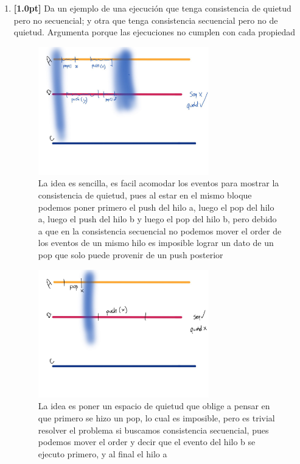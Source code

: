 \documentclass[a4paper,11pt]{article}
\begin{document}
\begin{enumerate}
    \item {\textbf{[1.0pt]} Da  un  ejemplo  de  una  ejecución  que  tenga  consistencia  de  quietud  pero  no secuencial; y otra que tenga consistencia secuencial pero no de quietud. Argumenta porque las ejecuciones no cumplen con cada propiedad
    
    \begin{figure}[!h]
      \centering
      \includegraphics[width=0.7\textwidth]{Graphics/na}
      \caption{La idea es sencilla, es facil acomodar los eventos para mostrar la consistencia de quietud, 
      pues al estar en el mismo bloque podemos poner primero el push del hilo a, luego el pop del hilo a, luego el push del hilo b y
      luego el pop del hilo b, pero debido a que en la consistencia secuencial no podemos mover el order de los eventos de un mismo hilo es imposible lograr un dato de un pop que solo puede provenir de un push posterior}
    \end{figure}

    \begin{figure}[!h]
      \centering
      \includegraphics[width=0.7\textwidth]{Graphics/nb}
      \caption{La idea es poner un espacio de quietud que oblige a pensar en que primero se hizo un pop, lo cual es imposible, pero es trivial resolver el problema si buscamos consistencia secuencial, 
      pues podemos mover el order y decir que el evento del hilo b se ejecuto primero, y al final el hilo a}
    \end{figure}
    }
    \clearpage


\end{enumerate}
\end{document}
